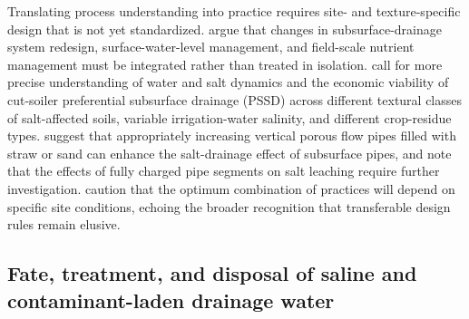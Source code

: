 \documentclass[11pt]{article}
\begin{document}
Translating process understanding into practice requires site- and texture-specific design that is not yet standardized. \textcite{vandenEertwegh2006} argue that changes in subsurface-drainage system redesign, surface-water-level management, and field-scale nutrient management must be integrated rather than treated in isolation. \textcite{Neha2022} call for more precise understanding of water and salt dynamics and the economic viability of cut-soiler preferential subsurface drainage (PSSD) across different textural classes of salt-affected soils, variable irrigation-water salinity, and different crop-residue types. \textcite{Wang2024d} suggest that appropriately increasing vertical porous flow pipes filled with straw or sand can enhance the salt-drainage effect of subsurface pipes, and \textcite{Yao2024} note that the effects of fully charged pipe segments on salt leaching require further investigation. \textcite{Jayawardane2001} caution that the optimum combination of practices will depend on specific site conditions, echoing the broader recognition that transferable design rules remain elusive.

\subsection{Fate, treatment, and disposal of saline and contaminant-laden drainage water}
\end{document}
